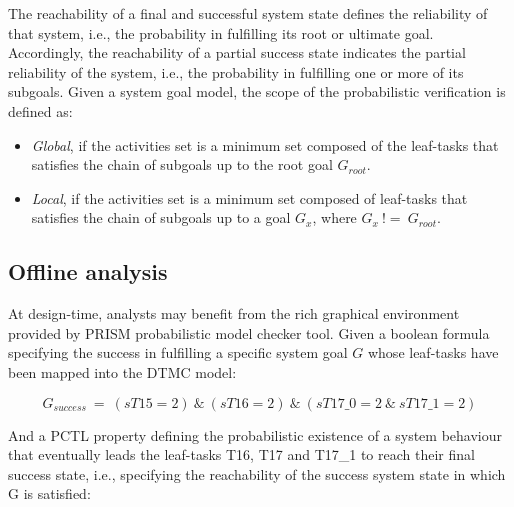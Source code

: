The reachability of a final and successful system state defines the reliability of that system, i.e., the probability in fulfilling its root or ultimate goal. Accordingly, the reachability of a partial success state indicates the partial reliability of the system, i.e., the probability in fulfilling one or more of its subgoals. Given a system goal model, the scope of the probabilistic verification is defined as:

\begin{itemize}

\item \textit{Global}, if the activities set is a minimum set composed of the leaf-tasks that satisfies the chain of subgoals up to the root goal $G_{root}$. 
\medskip

\item \textit{Local}, if the activities set is a minimum set composed of leaf-tasks that satisfies the chain of subgoals up to a goal $G_x$, where $G_x\ !=\ G_{root}$. 
\medskip

\end{itemize}




\subsection{Offline analysis}


At design-time, analysts may benefit from the rich graphical environment provided by PRISM probabilistic model checker tool. Given a boolean formula specifying the success in fulfilling a specific system goal $G$ whose leaf-tasks have been mapped into the DTMC model:

\begin{equation}\label{eq:Gx}
G_{success}\ =\ (sT15=2)\ \&\ (sT16=2)\ \&\ (sT17\_0=2\ \&\ sT17\_1=2)
\end{equation}

And a PCTL property defining the probabilistic existence of a system behaviour that eventually leads the leaf-tasks T16, T17 and T17\_1 to reach their final success state, i.e., specifying the reachability of the success system state in which G is satisfied:


